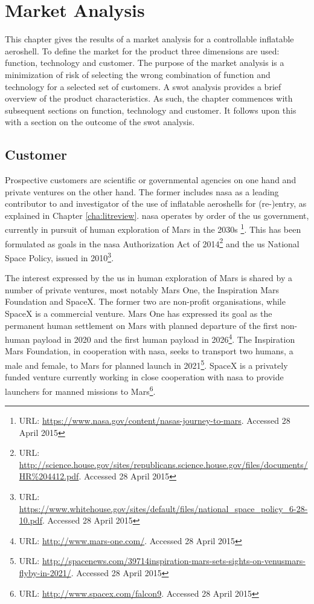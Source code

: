 \section{Market Analysis} \label{ch:market}
This chapter gives the results of a market analysis for a controllable inflatable aeroshell. To define the market for the product three dimensions are used: function, technology and customer. The purpose of the market analysis is a minimization of risk of selecting the wrong combination of function and technology for a selected set of customers. A \gls{swot} analysis provides a brief overview of the product characteristics. As such, the chapter commences with subsequent sections on function, technology and customer. It follows upon this with a section on the outcome of the \gls{swot} analysis.

\subsection{Customer}
Prospective customers are scientific or governmental agencies on one hand and private ventures on the other hand. The former includes \gls{nasa} as a leading contributor to and investigator of the use of inflatable aeroshells for (re-)entry, as explained in Chapter \ref{cha:litreview}. \gls{nasa} operates by order of the \gls{us} government, currently in pursuit of human exploration of Mars in the 2030s \footnote{URL: \url{https://www.nasa.gov/content/nasas-journey-to-mars}.  Accessed 28 April 2015}. This has been formulated as goals in the \gls{nasa} Authorization Act of 2014\footnote{URL: \url{http://science.house.gov/sites/republicans.science.house.gov/files/documents/HR\%204412.pdf}. Accessed 28 April 2015} and the \gls{us} National Space Policy, issued in 2010\footnote{URL: \url{https://www.whitehouse.gov/sites/default/files/national\_space\_policy\_6-28-10.pdf}. Accessed 28 April 2015}.

The interest expressed by the \gls{us} in human exploration of Mars is shared by a number of private ventures, most notably Mars One, the Inspiration Mars Foundation and SpaceX. The former two are non-profit organisations, while SpaceX is a commercial venture. Mars One has expressed its goal as the permanent human settlement on Mars with planned departure of the first non-human payload in 2020 and the first human payload in 2026\footnote{URL: \url{http://www.mars-one.com/}. Accessed 28 April 2015}. The Inspiration Mars Foundation, in cooperation with \gls{nasa}, seeks to transport two humans, a male and female, to Mars for planned launch in 2021\footnote{URL: \url{http://spacenews.com/39714inspiration-mars-sets-sights-on-venusmars-flyby-in-2021/}. Accessed 28 April 2015}. SpaceX is a privately funded venture currently working in close cooperation with \gls{nasa} to provide launchers for manned missions to Mars\footnote{URL: \url{http://www.spacex.com/falcon9}. Accessed 28 April 2015}.

